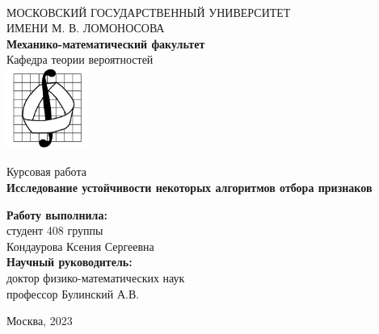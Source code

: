 \documentclass[14pt,a4paper]{extarticle}
\begin{document}
\begin{titlepage}



\begin{center}
\ \vspace{-2cm}

{МОСКОВСКИЙ ГОСУДАРСТВЕННЫЙ УНИВЕРСИТЕТ \\ ИМЕНИ М. В. ЛОМОНОСОВА}\\
{\bfseries Механико-математический факультет\\}
{Кафедра теории вероятностей}
\vspace{0.5cm}\\
\includegraphics[width=0.2\textwidth]{emblem.jpg}\\
\vspace{1cm}

{\large Курсовая работа}\\
{\Large\bfseries
Исследование устойчивости некоторых алгоритмов отбора признаков\\}
\end{center}

\vspace{1cm}
\begin{flushright}
  \textbf{Работу выполнила:}\\ студент 408 группы\\
  Кондаурова Ксения Сергеевна\\
  \textbf{Научный руководитель:}\\
 доктор физико-математических наук
 \\профессор 
 Булинский А.В.\\
 
\end{flushright}

\vspace{3cm}
\begin{center}
Москва, 2023
\end{center}
\enlargethispage{4\baselineskip}




\newpage
\end{titlepage}
\newpage
\end{document}
